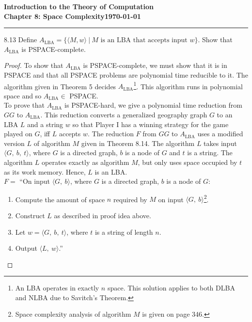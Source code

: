 \documentclass[11pt]{article}
\newcommand{\dated}{\today}
\begin{document}
\textbf{Introduction to the Theory of
Computation}\hfill\textbf{\myname}\\[0.01in]
\textbf{Chapter 8: Space Complexity}\hfill\textbf{\dated}\\
\smallskip\hrule\bigskip

\begin{problem}{8.13}
Define $A_{\text{LBA}} = \{\langle M,w \rangle \ | \ M \text{ is an LBA that accepts input } w\}$. Show that $A_{\text{LBA}}$ is PSPACE-complete.
\end{problem}

\begin{proof}
To show that $A_{\text{LBA}}$ is PSPACE-complete, we must show that it is in PSPACE and that all PSPACE problems are polynomial time reducible to it. The algorithm given in Theorem 5 decides $A_{\text{LBA}}$\footnote{An LBA operates in exactly $n$ space. This solution applies to both DLBA and NLBA due to Savitch's Theorem.}. This algorithm runs in polynomial space and so $A_{\text{LBA}} \in$ PSPACE. \\

To prove that $A_{\text{LBA}}$ is PSPACE-hard, we give a polynomial time reduction from $GG$ to $A_{\text{LBA}}$. This reduction converts a generalized geography graph $G$ to an LBA $L$ and a string $w$ so that Player I has a winning strategy for the game played on $G$, iff $L$ accepts $w$. The reduction $F$ from $GG$ to $A_{\text{LBA}}$ uses a modified version $L$ of algorithm $M$ given in Theorem 8.14. The algorithm $L$ takes input $\langle G, \ b, \ t \rangle$, where $G$ is a directed graph, $b$ is a node of $G$ and $t$ is a string. The algorithm $L$ operates exactly as algorithm $M$, but only uses space occupied by $t$ as its work memory. Hence, $L$ is an LBA. \\

$F =$ \textquotedblleft On input $\langle G, \ b \rangle$, where $G$ is a directed graph, $b$ is a node of $G$:
\begin{enumerate}
\item Compute the amount of space $n$ required by $M$ on input $\langle G, \ b \rangle$\footnote{Space complexity analysis of algorithm $M$ is given on page 346.}.
\item Construct $L$ as described in proof idea above.
\item Let $w = \langle G, \ b, \ t \rangle$, where $t$ is a string of length $n$.
\item Output $\langle L, \ w \rangle$.\textquotedblright
\end{enumerate}
\end{proof}
\end{document}

